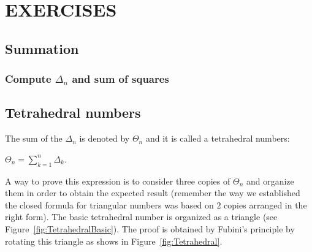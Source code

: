 
\chapter{EXERCISES}
\label{ch:Exercises}


\section{Summation}


\subsection{Compute $\Delta_n$ and sum of squares}


\section{Tetrahedral numbers}

The sum of the $\Delta_n$ is denoted by $\Theta_n$ and it is called a tetrahedral numbers:

$\Theta_n =  \sum_{k=1}^{n} \Delta_k$.


A way to prove this expression is to consider three copies of $\Theta_n$ and organize them in order to obtain the expected result
(remember the way we established the closed formula for triangular numbers was based on $2$ copies
arranged in the right form).
The basic tetrahedral number is organized as a triangle (see Figure~\ref{fig:TetrahedralBasic}).
The proof is obtained by Fubini's principle by rotating this triangle as shows in Figure~\ref{fig:Tetrahedral}.

